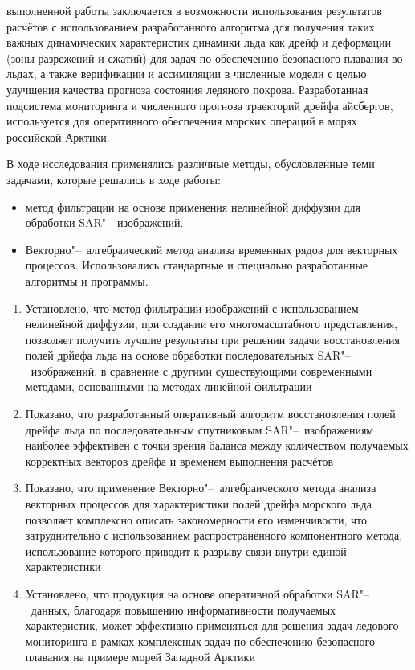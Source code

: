 {\influence} выполненной работы заключается в возможности использования результатов расчётов с использованием разработанного алгоритма для получения таких важных динамических характеристик динамики льда как дрейф и деформации (зоны разрежений и сжатий) для задач по обеспечению безопасного плавания во льдах, а также верификации и ассимиляции в численные модели с целью улучшения качества прогноза состояния ледяного покрова. Разработанная подсистема мониторинга и численного прогноза траекторий дрейфа айсбергов, используется для оперативного обеспечения морских операций в морях российской Арктики.

{\methods} В ходе исследования применялись различные методы, обусловленные теми задачами, которые решались в ходе работы:
\noindent
\begin{itemize}
	\item метод фильтрации на основе применения нелинейной диффузии для обработки SAR"--~изображений.
	\item Векторно"--~алгебраический метод анализа временных рядов для векторных процессов.
Использовались стандартные и специально разработанные алгоритмы и программы.
\end{itemize}


{}
\begin{enumerate}
  \item Установлено, что метод фильтрации изображений с использованием нелинейной диффузии, при создании его многомасштабного представления, позволяет получить лучшие результаты при решении задачи восстановления полей дрйефа льда на основе обработки последовательных SAR"--~изображений, в сравнение с другими существующими современными методами, основанными на методах линейной фильтрации
  \item Показано, что разработанный оперативный алгоритм восстановления полей дрейфа льда по последовательным спутниковым SAR"--~изображениям наиболее эффективен с точки зрения баланса между количеством получаемых корректных векторов дрейфа и временем выполнения расчётов
  \item Показано, что применение Векторно"--~алгебраического метода анализа векторных процессов для характеристики полей дрейфа морского льда позволяет комплексно описать закономерности его изменчивости, что затруднительно с использованием распространённого компонентного метода, использование которого приводит к разрыву связи внутри единой характеристики
  \item Установлено, что продукция на основе оперативной обработки SAR"--~данных, благодаря повышению информативности получаемых характеристик, может эффективно применяться для решения задач ледового мониторинга в рамках комплексных задач по обеспечению безопасного плавания на примере морей Западной Арктики
\end{enumerate}

